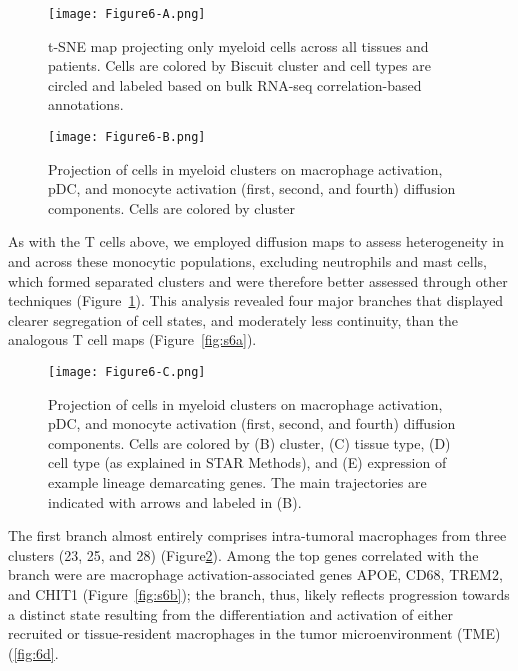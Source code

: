 \begin{figure}
\begin{minipage}{.5\textwidth}
  \centering
  \texttt{[image: Figure6-A.png]}
  \caption{t-SNE map projecting only myeloid cells across all tissues and patients. Cells are colored by Biscuit cluster and cell types are circled and labeled based on bulk RNA-seq correlation-based annotations.}
  \label{fig:6a}
\end{minipage}
\begin{minipage}{.5\textwidth}
  \centering
  \texttt{[image: Figure6-B.png]}
  \caption{Projection of cells in myeloid clusters on macrophage activation, pDC, and monocyte activation (first, second, and fourth) diffusion components. Cells are colored by cluster}
  \label{fig:6b}
\end{minipage}
\end{figure}

As with the T cells above, we employed diffusion maps to assess heterogeneity in and across these monocytic populations, excluding neutrophils and mast cells, which formed separated clusters and were therefore better assessed through other techniques (Figure~\ref{fig:6b}).
This analysis revealed four major branches that displayed clearer segregation of cell states, and moderately less continuity, than the analogous T cell maps (Figure~\ref{fig:s6a}).

\begin{figure}
\centering
\texttt{[image: Figure6-C.png]}
\caption{Projection of cells in myeloid clusters on macrophage activation, pDC, and monocyte activation (first, second, and fourth) diffusion components.
  Cells are colored by (B) cluster, (C) tissue type, (D) cell type (as explained in STAR Methods), and (E) expression of example lineage demarcating genes.
  The main trajectories are indicated with arrows and labeled in (B).
}
\label{fig:6c}
\end{figure}

The first branch almost entirely comprises intra-tumoral macrophages from three clusters (23, 25, and 28) (Figure\ref{fig:6c}).
Among the top genes correlated with the branch were are macrophage activation-associated genes APOE, CD68, TREM2, and CHIT1 (Figure~\ref{fig:s6b}); the branch, thus, likely reflects progression towards a distinct state resulting from the differentiation and activation of either recruited or tissue-resident macrophages in the tumor microenvironment (TME) (\ref{fig:6d}. 

